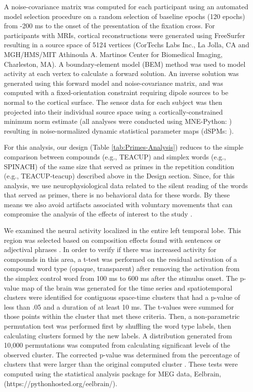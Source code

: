 \documentclass{frontiersSCNS}
\begin{document}
A noise-covariance matrix was computed for each participant using an automated model selection procedure \citep*{Engemann:2014} on a random selection of baseline epochs (120 epochs) from -200 ms to the onset of the presentation of the fixation cross.  For participants with MRIs, cortical reconstructions were generated using FreeSurfer resulting in a source space of 5124 vertices (CorTechs Labs Inc., La Jolla, CA and MGH/HMS/MIT Athinoula A. Martinos Center for Biomedical Imaging, Charleston, MA). A boundary-element model (BEM) method was used to model activity at each vertex to calculate a forward solution. An inverse solution was generated using this forward model and noise-covariance matrix, and was computed with a fixed-orientation constraint requiring dipole sources to be normal to the cortical surface.
The sensor data for each subject was then projected into their individual source space using a cortically-constrained minimum norm estimate (all analyses were conducted using MNE-Python: \citet*{Gramfort:2013, Gramfort:2013a}) resulting in noise-normalized dynamic statistical parameter maps (dSPMs: \citet*{Dale:2000}).

For this analysis, our design (Table \ref{tab:Primes-Analysis}) reduces to the simple comparison between compounds (e.g., TEACUP) and simplex words (e.g., SPINACH) of the same size that served as primes in the repetition condition (e.g., TEACUP-teacup) described above in the Design section. Since, for this analysis, we use neurophysiological data related to the silent reading of the words that served as primes, there is no behavioral data for these words.  By these means we also avoid artifacts associated with voluntary movements that can compromise the analysis of the effects of interest to the study \citep*{Hansen:2010}.
 
We examined the neural activity localized in the entire left temporal lobe. This region was selected based on composition effects found with sentences \citep{Friederici:2000} or adjectival phrases \citep{Bemis:2011}.
In order to verify if there was increased activity for compounds in this area, a t-test was performed on the residual activation of a compound word type (opaque, transparent) after removing the activation from the simplex control word from 100 ms to 600 ms after the stimulus onset. The p-value map of the brain was generated for the time series and spatiotemporal clusters were identified for contiguous space-time clusters that had a p-value of less than .05 and a duration of at least 10 ms. The t-values were summed for those points within the cluster that met these criteria. Then, a non-parametric permutation test was performed first by shuffling the word type labels, then calculating clusters formed by the new labels. A distribution generated from 10,000 permutations was computed from calculating significant levels of the observed cluster. The corrected p-value was determined from the percentage of clusters that were larger than the original computed cluster \citep*{Maris:2007}. These tests were computed using the statistical analysis package for MEG data, Eelbrain, (https://pythonhosted.org/eelbrain/).
\end{document}
